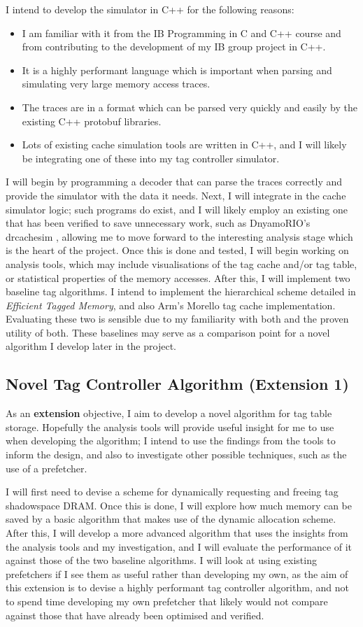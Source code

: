 \documentclass[10pt,a4paper]{article}
\begin{document}
I intend to develop the simulator in C++ for the following reasons:
\begin{itemize}
	\item I am familiar with it from the IB Programming in C and C++ course and from contributing to the development of my IB group project in C++.
	\item It is a highly performant language which is important when parsing and simulating very large memory access traces.
	\item The traces are in a format which can be parsed very quickly and easily by the existing C++ protobuf libraries.
	\item Lots of existing cache simulation tools are written in C++, and I will likely be integrating one of these into my tag controller simulator.
\end{itemize}

I will begin by programming a decoder that can parse the traces correctly and provide the simulator with the data it needs. Next, I will integrate in the cache simulator logic; such programs do exist, and I will likely employ an existing one that has been verified to save unnecessary work, such as DnyamoRIO's drcachesim \cite{drcachesim}, allowing me to move forward to the interesting analysis stage which is the heart of the project. Once this is done and tested, I will begin working on analysis tools, which may include visualisations of the tag cache and/or tag table, or statistical properties of the memory accesses. After this, I will implement two baseline tag algorithms. I intend to implement the hierarchical scheme detailed in \textit{Efficient Tagged Memory}, and also Arm's Morello tag cache implementation. Evaluating these two is sensible due to my familiarity with both and the proven utility of both. These baselines may serve as a comparison point for a novel algorithm I develop later in the project.

\subsection*{Novel Tag Controller Algorithm (Extension 1)}
As an \textbf{extension} objective, I aim to develop a novel algorithm for tag table storage. Hopefully the analysis tools will provide useful insight for me to use when developing the algorithm; I intend to use the findings from the tools to inform the design, and also to investigate other possible techniques, such as the use of a prefetcher.

I will first need to devise a scheme for dynamically requesting and freeing tag shadowspace DRAM. Once this is done, I will explore how much memory can be saved by a basic algorithm that makes use of the dynamic allocation scheme. After this, I will develop a more advanced algorithm that uses the insights from the analysis tools and my investigation, and I will evaluate the performance of it against those of the two baseline algorithms. I will look at using existing prefetchers if I see them as useful rather than developing my own, as the aim of this extension is to devise a highly performant tag controller algorithm, and not to spend time developing my own prefetcher that likely would not compare against those that have already been optimised and verified.
\end{document}
